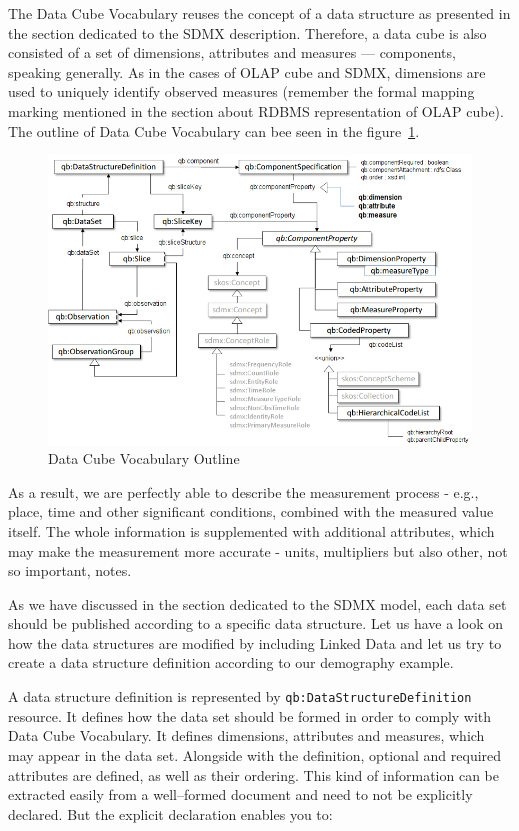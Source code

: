 The Data Cube Vocabulary reuses the concept of a data structure as presented in the section
dedicated to the SDMX description. Therefore, a data cube is also consisted of a set of
dimensions, attributes and measures --- components, speaking generally. As in the cases of
OLAP cube and SDMX, dimensions are used to uniquely identify observed measures
(remember the formal mapping marking mentioned in the section about RDBMS representation
of OLAP cube). The outline of Data Cube Vocabulary can bee seen in the 
figure~\ref{fig:lod-cloud}.
 
\begin{figure}
	\centering
	\includegraphics[width=150mm]{img/dcv-schema.png}
	\caption{Data Cube Vocabulary Outline~\cite{dcv}}
	\label{fig:lod-cloud}
\end{figure}

As a result, we are perfectly able to describe the measurement process - e.g., place, time and
other significant conditions, combined with the measured value itself. The whole information
is supplemented with additional attributes, which may make the measurement more accurate
- units, multipliers but also other, not so important, notes.

As we have discussed in the section dedicated to the SDMX model, each data set should be
published according to a specific data structure. Let us have a look on how the data structures are
modified by including Linked Data and let us try to create a data structure definition according
to our demography example.

A data structure definition is represented by \texttt{qb:DataStructureDefinition} resource. It defines
how the data set should be formed in order to comply with Data Cube Vocabulary. It defines
dimensions, attributes and measures, which may appear in the data set. Alongside with the
definition, optional and required attributes are defined, as well as their ordering. This kind
of information can be extracted easily from a well--formed document and need to not be explicitly
declared. But the explicit declaration enables you to:

